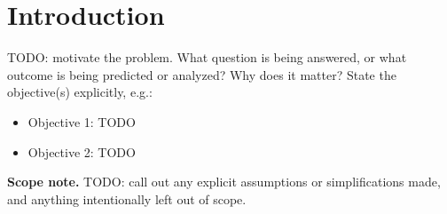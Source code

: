 \section{Introduction}
\label{sec:introduction}

TODO: motivate the problem. What question is being answered, or what
outcome is being predicted or analyzed? Why does it matter? State the
objective(s) explicitly, e.g.:

\begin{itemize}
    \item Objective 1: TODO
    \item Objective 2: TODO
\end{itemize}

\begin{notebox}
\textbf{Scope note.} TODO: call out any explicit assumptions or
simplifications made, and anything intentionally left out of scope.
\end{notebox}
